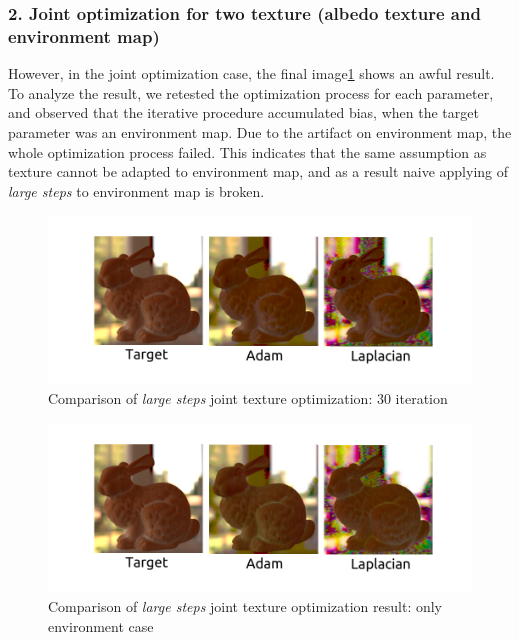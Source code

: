 \subsubsection{2. Joint optimization for two texture (albedo texture and environment map)}

However, in the joint optimization case, the final image\ref{fig:joint-texture-comparision-Laplacian} shows an awful result. To analyze the result, we retested the optimization process for each parameter, and observed that the iterative procedure accumulated bias, when the target parameter was an environment map. Due to the artifact on environment map, the whole optimization process failed. This indicates that the same assumption as texture cannot be adapted to environment map, and as a result naive applying of \emph{large steps} to environment map is broken.

\begin{figure}[!h]
    \includegraphics[width=\textwidth]{figures/result-2.png}
    \caption{Comparison of \emph{large steps} joint texture optimization: 30 iteration}
    \label{fig:joint-texture-comparision-Laplacian}
\end{figure}

\begin{figure}[!h]
    \includegraphics[width=\textwidth]{figures/result-2-1.png}
    \caption{Comparison of \emph{large steps} joint texture optimization result: only environment case}
    \label{fig:joint-texture-comparision-Laplacian-envmap}
\end{figure}

